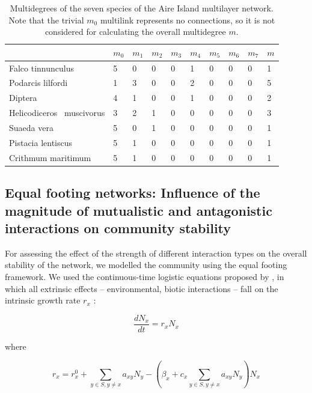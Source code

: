 \begin{table} \small
\caption[Multidegrees of the Aire Island multilayer network]{\color{Gray}Multidegrees of the seven species of the Aire Island multilayer network. Note that the trivial $m_0$ multilink represents no connections, so it is not considered for calculating the overall multidegree $m$.}\label{tab:table1.3}
\begin{tabularx}{\textwidth}{p{4cm}XXXXXXXXX}
\hline
& $m_0$ & $m_1$ & $m_2$ & $m_3$ & $m_4$ & $m_5$ & $m_6$ & $m_7$ & $m$\\ \hline
Falco tinnunculus & 5 & 0 & 0 & 0 & 1 & 0 & 0 & 0 & 1\\
Podarcis lilfordi & 1 & 3 & 0 & 0 & 2 & 0 & 0 & 0 & 5\\
Diptera & 4 & 1 & 0 & 0 & 1 & 0 & 0 & 0 & 2\\
Helicodiceros \ muscivorus & 3 & 2 & 1 & 0 & 0 & 0 & 0 & 0 & 3\\
Suaeda vera & 5 & 0 & 1 & 0 & 0 & 0 & 0 & 0 & 1\\
Pistacia lentiscus & 5 & 1 & 0 & 0 & 0 & 0 & 0 & 0 & 1\\
Crithmum maritimum & 5 & 1 & 0 & 0 & 0 & 0 & 0 & 0 & 1\\ \hline
\end{tabularx}

\end{table}


\subsection*{Equal footing networks: Influence of the magnitude of mutualistic and antagonistic interactions on community stability}

For assessing the effect of the strength of different interaction types on the overall stability of the network, we modelled the community using the equal footing framework. We used the continuous-time logistic equations proposed by \cite{Garcia-Algarra2014}, in which all extrinsic effects -- environmental, biotic interactions -- fall on the intrinsic growth rate  $r_x$ :

\begin{equation} \label{eq:6}
\frac{\mathit{dN}_x}{\mathit{dt}}=r_xN_x
\end{equation}

where

\begin{equation} \label{eq:7}
r_x=r_x^0+\sum _{y{\in}S,y{\neq}x}a_{\mathit{xy}}N_y-\left(\beta _x+c_x\sum _{y{\in}S,y{\neq}x}a_{\mathit{xy}}N_y\right)N_x
\end{equation}

